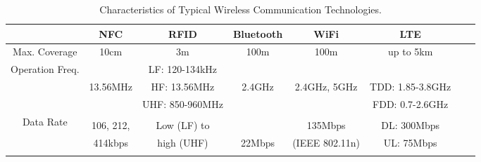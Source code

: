 \documentclass[journal]{IEEEtran}
\begin{document}
\begin{table*}\footnotesize
  \centering
  \caption{Characteristics of Typical Wireless Communication Technologies.}
  \label{tab:WCTech}
  \begin{tabular}{cccccccc}
   \hline \hline
      & NFC & RFID & Bluetooth & WiFi  & LTE & \color{black}{5G}\\
    \hline
    Max. Coverage &  10cm & 3m  & 100m & 100m  & up to 5km & \color{black}{Excellent coverage} \\
    \hline

   \multirow{3}{*}{Operation Freq.}  \multirow{3}{*}  &   & LF: 120-134kHz  &  &  & &   \tabularnewline & 13.56MHz &   HF: 13.56MHz   & 2.4GHz & 2.4GHz, 5GHz & TDD: 1.85-3.8GHz & \color{black}{6-100GHz} \tabularnewline &   & UHF: 850-960MHz   &  &  & FDD: 0.7-2.6GHz & \\ \hline

   \multirow{2}{*}{Data Rate}  \multirow{4}{*}  & & & & & & \color{black}{Indoor/dense outdoor:} \tabularnewline &  106, 212, &  Low (LF) to   &  & 135Mbps &  DL: 300Mbps & \color{black}{up to 10Gbps}\tabularnewline & 414kbps &   high (UHF)  & 22Mbps & (IEEE 802.11n) & UL: 75Mbps & \color{black}{Urban/suburban:} \tabularnewline
     & & & & & & \color{black}{$>$ hundreds of Mbps} \tabularnewline
    \hline
  \end{tabular}
\end{table*}
\end{document}
